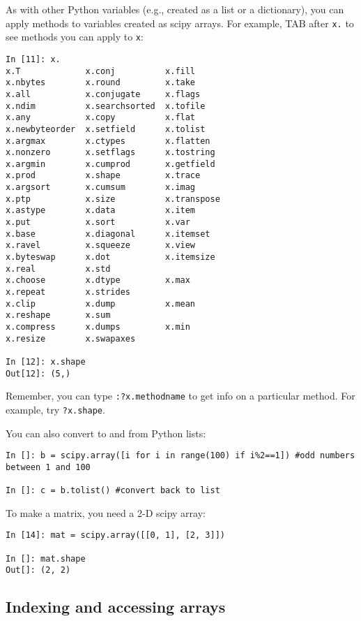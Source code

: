 As with other Python variables (e.g., created as a list or a 
dictionary), you can apply methods to variables created as scipy 
arrays. For example, TAB after {\tt x.} to see methods you can apply to 
{\tt x}:
\begin{lstlisting}
In [11]: x. 
x.T             x.conj          x.fill          
x.nbytes        x.round         x.take
x.all           x.conjugate     x.flags         
x.ndim          x.searchsorted  x.tofile
x.any           x.copy          x.flat          
x.newbyteorder  x.setfield      x.tolist
x.argmax        x.ctypes        x.flatten       
x.nonzero       x.setflags      x.tostring
x.argmin        x.cumprod       x.getfield      
x.prod          x.shape         x.trace
x.argsort       x.cumsum        x.imag         
x.ptp           x.size          x.transpose
x.astype        x.data          x.item          
x.put           x.sort          x.var
x.base          x.diagonal      x.itemset       
x.ravel         x.squeeze       x.view
x.byteswap      x.dot           x.itemsize      
x.real          x.std           
x.choose        x.dtype         x.max           
x.repeat        x.strides       
x.clip          x.dump          x.mean          
x.reshape       x.sum           
x.compress      x.dumps         x.min           
x.resize        x.swapaxes      

In [12]: x.shape
Out[12]: (5,)
\end{lstlisting}

\begin{tipbox}
	Remember, you can type {\tt :?x.methodname} to get info on a particular method. For 
example, try {\tt ?x.shape}.
\end{tipbox}

You can also convert to and from Python lists:

\begin{lstlisting}
In []: b = scipy.array([i for i in range(100) if i%2==1]) #odd numbers 
between 1 and 100

In []: c = b.tolist() #convert back to list
 \end{lstlisting}

To make a  matrix, you need a 2-D scipy array:
\begin{lstlisting}
In [14]: mat = scipy.array([[0, 1], [2, 3]])

In []: mat.shape
Out[]: (2, 2)
\end{lstlisting}

\subsection{Indexing and accessing arrays}

